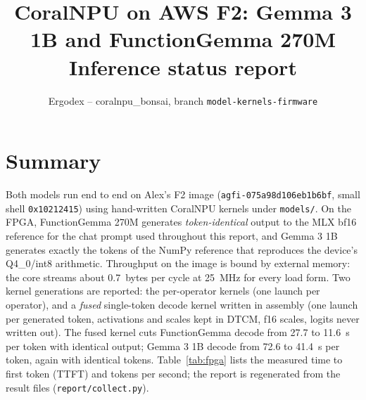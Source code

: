 \documentclass[11pt]{article}
\title{CoralNPU on AWS F2: Gemma 3 1B and FunctionGemma 270M\\\large Inference status report}
\author{Ergodex -- coralnpu\_bonsai, branch \texttt{model-kernels-firmware}}
\date{\reportdate}
\begin{document}
\maketitle

\section{Summary}
Both models run end to end on Alex's F2 image (\texttt{agfi-075a98d106eb1b6bf}, small shell
\texttt{0x10212415}) using hand-written CoralNPU kernels under \texttt{models/}. On the FPGA,
FunctionGemma 270M generates \emph{token-identical} output to the MLX bf16 reference for the chat
prompt used throughout this report, and Gemma 3 1B generates exactly the tokens of the NumPy
reference that reproduces the device's Q4\_0/int8 arithmetic. Throughput on the image is bound by
external memory: the core streams about 0.7~bytes per cycle at 25~MHz for every load form.
Two kernel generations are reported: the per-operator kernels (one launch per operator), and a
\emph{fused} single-token decode kernel written in assembly (one launch per generated token,
activations and scales kept in DTCM, f16 scales, logits never written out). The fused kernel
cuts FunctionGemma decode from 27.7 to 11.6~s per token with identical output; Gemma 3 1B
decode from 72.6 to 41.4~s per token, again with identical tokens. Table~\ref{tab:fpga} lists the
measured time to first token (TTFT) and tokens per second; the report is regenerated from the
result files (\texttt{report/collect.py}).
\end{document}
